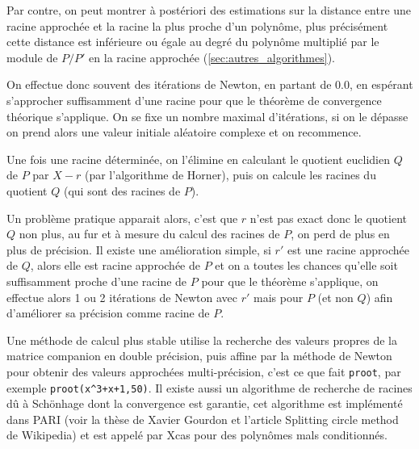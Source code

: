 \documentclass[a4paper,11pt]{article}
\begin{document}
\begin{giacjshere}
Par contre, on peut montrer \`a post\'eriori des estimations sur la
distance entre une racine approch\'ee et la racine la plus proche
d'un polyn\^ome, plus pr\'ecis\'ement cette distance est inf\'erieure
ou \'egale au degr\'e du polyn\^ome multipli\'e par le module
de $P/P'$ en la racine approch\'ee (\ref{sec:autres_algorithmes}).

On effectue donc souvent des it\'erations de Newton, en partant de
0.0, en esp\'erant s'approcher suffisamment d'une racine pour que
le th\'eor\`eme de convergence th\'eorique s'applique. On se fixe
un nombre maximal d'it\'erations, si on le d\'epasse on prend alors
une valeur initiale al\'eatoire complexe et on recommence.

Une fois une racine d\'etermin\'ee, on l'\'elimine en calculant
le quotient euclidien $Q$ de $P$ par $X-r$ (par l'algorithme de Horner),
puis on calcule les racines du quotient $Q$ (qui sont des racines de $P$).

Un probl\`eme pratique apparait alors, c'est que $r$ n'est pas exact
donc le quotient $Q$ non plus, au fur et \`a mesure du calcul des
racines de $P$, on perd de plus en plus de pr\'ecision.
Il existe une am\'elioration simple, si $r'$ est une racine
approch\'ee de $Q$, alors elle est racine approch\'ee de $P$
et on a toutes les chances qu'elle soit suffisamment proche
d'une racine de $P$ pour que le th\'eor\`eme s'applique, on
effectue alors 1 ou 2 it\'erations de Newton avec $r'$ mais pour $P$
(et non $Q$) afin d'am\'eliorer sa pr\'ecision comme racine de $P$.

Une m\'ethode de calcul plus stable utilise la recherche des valeurs
propres de la matrice companion en double pr\'ecision, 
puis affine par la m\'ethode de
Newton pour obtenir des valeurs approch\'ees multi-pr\'ecision,
c'est ce que fait \verb|proot|, par exemple \verb|proot(x^3+x+1,50)|.
Il existe aussi un algorithme de recherche de racines
d\^u \`a Sch\"onhage dont la convergence
est garantie, cet algorithme est impl\'ement\'e dans PARI (voir
la th\`ese de Xavier Gourdon et l'article Splitting circle method de Wikipedia)
et est appel\'e par Xcas pour des polyn\^omes mals conditionn\'es.


\end{giacjshere}
\end{document}
